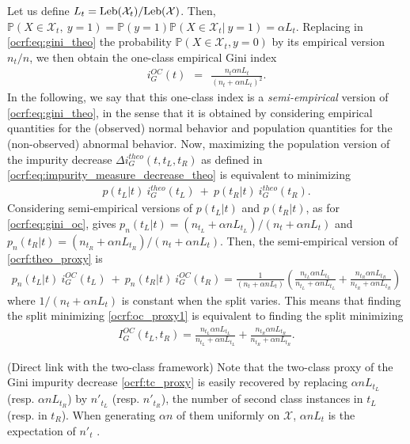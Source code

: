 Let us define $L_t=\text{Leb}(\mathcal{X}_t)/\text{Leb}(\mathcal{X})$. Then, $\mathbb{P}(X \in \mathcal{X}_t,~ y = 1)= \mathbb{P}(y = 1) \mathbb{P}(X \in \mathcal{X}_t|~ y = 1) = \alpha L_t $. Replacing in \eqref{ocrf:eq:gini_theo} the probability $\mathbb{P}(X \in \mathcal{X}_t, y=0)$ by its empirical version $n_t / n$, we then obtain the one-class empirical Gini index
\begin{align}
\label{ocrf:eq:gini_oc}
  i_G^{OC}(t) ~~=~~ \frac{n_t \alpha n L_t}{(n_t + \alpha n L_t)^2}.
\end{align}
In the following, we say that this one-class index is a \emph{semi-empirical} version of \eqref{ocrf:eq:gini_theo}, in the sense that it is obtained by considering empirical quantities for the (observed) normal behavior and population quantities for the (non-observed) abnormal behavior.
%
Now, maximizing the population version of the impurity decrease $\Delta i_G^{theo}(t, t_L, t_R)$ as defined in \eqref{ocrf:eq:impurity_measure_decrease_theo} is equivalent to minimizing
\begin{align}
\label{ocrf:theo_proxy}
 p(t_L | t)~ i_G^{theo}(t_L) ~+~  p(t_R | t)~ i_G^{theo}(t_R).
\end{align}
Considering semi-empirical versions of $p(t_L | t)$ and $p(t_R | t)$, as for \eqref{ocrf:eq:gini_oc}, gives $p_n(t_L | t) = (n_{t_L} + \alpha n L_{t_L}) / (n_{t} + \alpha n L_{t})$ and $p_n(t_R | t) = (n_{t_R} + \alpha n L_{t_R}) / (n_{t} + \alpha n L_{t})$. Then, the semi-empirical version of \eqref{ocrf:theo_proxy} is
\begin{align}
\label{ocrf:oc_proxy1}
p_n(t_L | t)~ i_G^{OC}(t_L) ~+~  p_n(t_R | t)~ i_G^{OC}(t_R) = \frac{1}{(n_{t} + \alpha n L_{t})} \left(\frac{n_{t_L}\alpha n L_{t_L}}{n_{t_L} + \alpha n L_{t_L}} + \frac{n_{t_R}\alpha n L_{t_R}}{n_{t_R} + \alpha n L_{t_R}}\right)
\end{align}
where $ 1/(n_{t} + \alpha n L_{t})$ is constant when the split varies.
This means that finding the split minimizing \eqref{ocrf:oc_proxy1} is equivalent to finding the split minimizing
\begin{align}
\label{ocrf:oc_proxy2}
I_G^{OC}(t_L, t_R)= \frac{n_{t_L}\alpha n L_{t_L}}{n_{t_L} + \alpha n L_{t_L}} + \frac{n_{t_R}\alpha n L_{t_R}}{n_{t_R} + \alpha n L_{t_R}}.
\end{align}

\begin{remark} ({\sc Direct link with the two-class framework})
Note that the two-class proxy of the Gini impurity decrease \eqref{ocrf:tc_proxy} is easily recovered by replacing $\alpha n L_{t_L}$ (resp. $\alpha n L_{t_R}$) by $n'_{t_L}$ (resp. $n'_{t_R}$), the number of second class instances in $t_L$ (resp. in $t_R$). When generating $\alpha n$ of them uniformly on $\mathcal{X}$, $\alpha n L_{t}$ is the expectation of $n'_{t}$ .
\end{remark}


